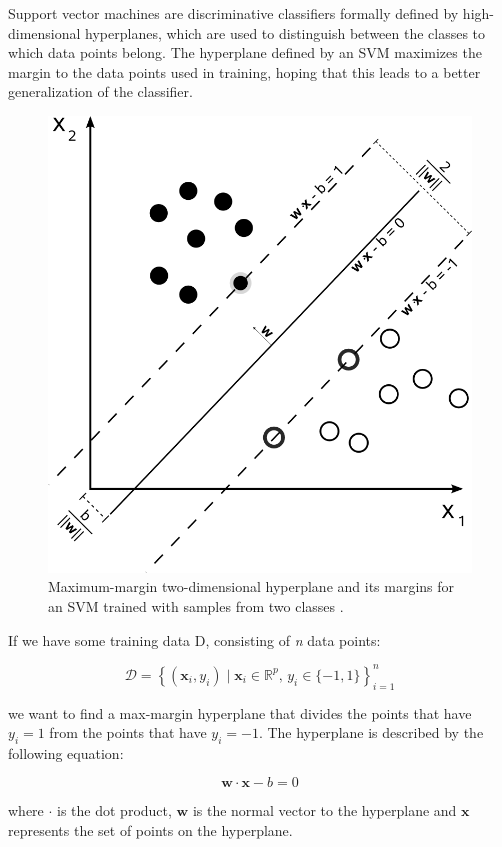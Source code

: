 Support vector machines\cite{Cortes_1995} are discriminative classifiers formally defined by high-dimensional hyperplanes, which are used to distinguish between the classes to which data points belong. The hyperplane defined by an SVM maximizes the margin to the data points used in training, hoping that this leads to a better generalization of the classifier. 

\begin{figure}[h]
\begin{center}
\includegraphics[width=0.7\columnwidth]{img/svm_max_margin.png}
\caption{
\label{fig:svm_max_margin}
Maximum-margin two-dimensional hyperplane and its margins for an SVM trained with samples from two classes \cite{svm_max_margin}.
}
\end{center}
\end{figure}

If we have some training data D, consisting of \textit{n} data points:

\[
	\mathcal{D} = \left\{ (\mathbf{x}_i, y_i)\mid\mathbf{x}_i \in \mathbb{R}^p,\, y_i \in \{-1,1\}\right\}_{i=1}^n
\]

we want to find a max-margin hyperplane that divides the points that have $ y_i = 1 $ from the points that have $ y_i = -1 $. The hyperplane is described by the following equation:

\begin{equation}
\label{eq:svm_hyperplane}
\mathbf{w}\cdot\mathbf{x} - b=0
\end{equation}

where $ \cdot $ is the dot product, $ \mathbf{w} $ is the normal vector to the hyperplane and $ \mathbf{x} $ represents the set of points on the hyperplane. 

